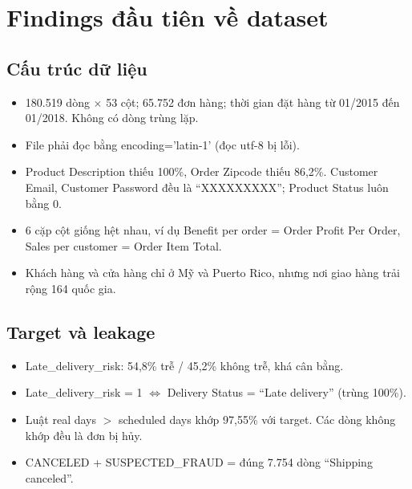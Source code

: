 \documentclass[11pt,a4paper]{article}
\newcommand{\col}[1]{\textsf{#1}}
\begin{document}
\section{Findings đầu tiên về dataset}

\subsection{Cấu trúc dữ liệu}
\begin{itemize}
  \item 180.519 dòng $\times$ 53 cột; 65.752 đơn hàng; thời gian đặt hàng từ 01/2015 đến 01/2018. Không có dòng trùng lặp.
  \item File phải đọc bằng \col{encoding='latin-1'} (đọc utf-8 bị lỗi).
  \item \col{Product Description} thiếu 100\%, \col{Order Zipcode} thiếu 86,2\%. \col{Customer Email}, \col{Customer Password} đều là ``XXXXXXXXX''; \col{Product Status} luôn bằng 0.
  \item 6 cặp cột giống hệt nhau, ví dụ \col{Benefit per order} = \col{Order Profit Per Order}, \col{Sales per customer} = \col{Order Item Total}.
  \item Khách hàng và cửa hàng chỉ ở Mỹ và Puerto Rico, nhưng nơi giao hàng trải rộng 164 quốc gia.
\end{itemize}

\subsection{Target và leakage}
\begin{itemize}
  \item \col{Late\_delivery\_risk}: 54,8\% trễ / 45,2\% không trễ, khá cân bằng.
  \item \col{Late\_delivery\_risk} = 1 $\Leftrightarrow$ \col{Delivery Status} = ``Late delivery'' (trùng 100\%).
  \item Luật \col{real days} $>$ \col{scheduled days} khớp 97,55\% với target. Các dòng không khớp đều là đơn bị hủy.
  \item CANCELED + SUSPECTED\_FRAUD = đúng 7.754 dòng ``Shipping canceled''.
\end{itemize}
\end{document}
